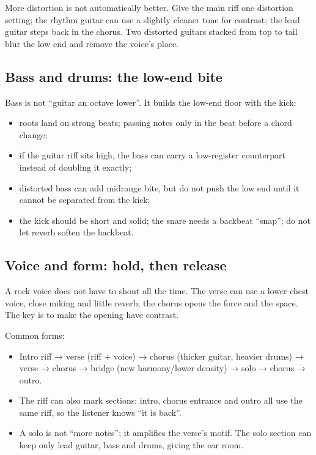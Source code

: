 More distortion is not automatically better. Give the main riff one distortion setting; the rhythm guitar can use a slightly cleaner tone for contrast; the lead guitar steps back in the chorus. Two distorted guitars stacked from top to tail blur the low end and remove the voice's place.

\subsection{Bass and drums: the low-end bite}
\label{sec:rock-rhythm-section}

Bass is not ``guitar an octave lower''. It builds the low-end floor with the kick:

\begin{itemize}
\item roots land on strong beats; passing notes only in the beat before a chord change;
\item if the guitar riff sits high, the bass can carry a low-register counterpart instead of doubling it exactly;
\item distorted bass can add midrange bite, but do not push the low end until it cannot be separated from the kick;
\item the kick should be short and solid; the snare needs a backbeat ``snap''; do not let reverb soften the backbeat.
\end{itemize}

\subsection{Voice and form: hold, then release}
\label{sec:rock-vocal-form}

A rock voice does not have to shout all the time. The verse can use a lower chest voice, close miking and little reverb; the chorus opens the force and the space. The key is to make the opening have contrast.

Common forms:

\begin{itemize}
\item Intro riff → verse (riff + voice) → chorus (thicker guitar, heavier drums) → verse → chorus → bridge (new harmony/lower density) → solo → chorus → outro.
\item The riff can also mark sections: intro, chorus entrance and outro all use the same riff, so the listener knows ``it is back''.
\item A solo is not ``more notes''; it amplifies the verse's motif. The solo section can keep only lead guitar, bass and drums, giving the ear room.
\end{itemize}

